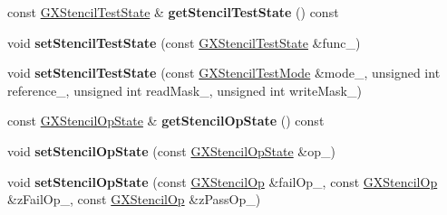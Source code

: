 \begin{DoxyCompactItemize}
\item 
const \hyperlink{class_i_dream_sky_1_1_g_x_stencil_test_state}{G\+X\+Stencil\+Test\+State} \& {\bfseries get\+Stencil\+Test\+State} () const \hypertarget{class_i_dream_sky_1_1_g_x_context_a82a9ced7888e1aeba24a58fd58f36ba1}{}\label{class_i_dream_sky_1_1_g_x_context_a82a9ced7888e1aeba24a58fd58f36ba1}

\item 
void {\bfseries set\+Stencil\+Test\+State} (const \hyperlink{class_i_dream_sky_1_1_g_x_stencil_test_state}{G\+X\+Stencil\+Test\+State} \&func\+\_\+)\hypertarget{class_i_dream_sky_1_1_g_x_context_a53793812a528408adbb95200ed2e5376}{}\label{class_i_dream_sky_1_1_g_x_context_a53793812a528408adbb95200ed2e5376}

\item 
void {\bfseries set\+Stencil\+Test\+State} (const \hyperlink{class_i_dream_sky_1_1_g_x_stencil_test_mode}{G\+X\+Stencil\+Test\+Mode} \&mode\+\_\+, unsigned int reference\+\_\+, unsigned int read\+Mask\+\_\+, unsigned int write\+Mask\+\_\+)\hypertarget{class_i_dream_sky_1_1_g_x_context_a51ddac53d744f328ecae61f0d3586b70}{}\label{class_i_dream_sky_1_1_g_x_context_a51ddac53d744f328ecae61f0d3586b70}

\item 
const \hyperlink{class_i_dream_sky_1_1_g_x_stencil_op_state}{G\+X\+Stencil\+Op\+State} \& {\bfseries get\+Stencil\+Op\+State} () const \hypertarget{class_i_dream_sky_1_1_g_x_context_aa2d848fa986ee4cdf03249b482a040a2}{}\label{class_i_dream_sky_1_1_g_x_context_aa2d848fa986ee4cdf03249b482a040a2}

\item 
void {\bfseries set\+Stencil\+Op\+State} (const \hyperlink{class_i_dream_sky_1_1_g_x_stencil_op_state}{G\+X\+Stencil\+Op\+State} \&op\+\_\+)\hypertarget{class_i_dream_sky_1_1_g_x_context_a267e9f4484544b447c580a85972df65e}{}\label{class_i_dream_sky_1_1_g_x_context_a267e9f4484544b447c580a85972df65e}

\item 
void {\bfseries set\+Stencil\+Op\+State} (const \hyperlink{class_i_dream_sky_1_1_g_x_stencil_op}{G\+X\+Stencil\+Op} \&fail\+Op\+\_\+, const \hyperlink{class_i_dream_sky_1_1_g_x_stencil_op}{G\+X\+Stencil\+Op} \&z\+Fail\+Op\+\_\+, const \hyperlink{class_i_dream_sky_1_1_g_x_stencil_op}{G\+X\+Stencil\+Op} \&z\+Pass\+Op\+\_\+)\hypertarget{class_i_dream_sky_1_1_g_x_context_a51c51855b627d2c2f0a48170cee85376}{}\label{class_i_dream_sky_1_1_g_x_context_a51c51855b627d2c2f0a48170cee85376}


\end{DoxyCompactItemize}
